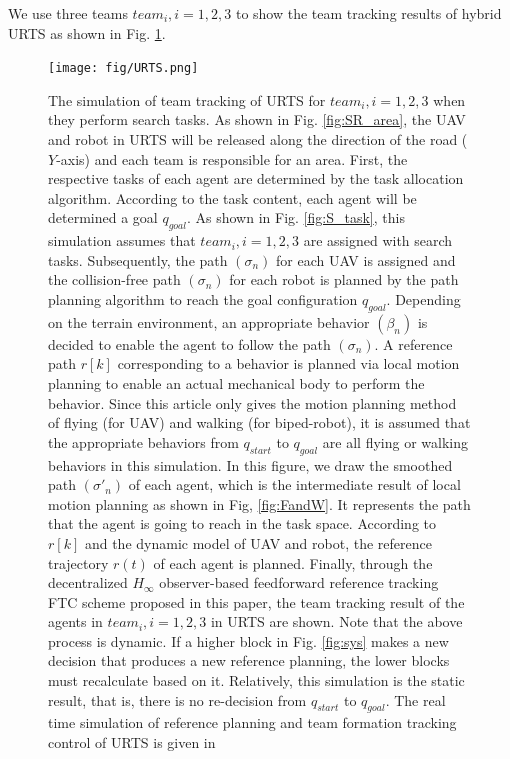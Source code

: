 \documentclass[journal,12pt,onecolumn,draftclsnofoot,]{IEEEtran}
\begin{document}
We use three teams $team_i, i=1, 2, 3$ to show the team tracking results of hybrid URTS as shown in Fig. \ref{fig:URTS}.
\begin{figure}[htbp]
    \centering
    \texttt{[image: fig/URTS.png]}\caption{The simulation of team tracking of URTS for $team_i,i=1,2,3$ when they perform search tasks. As shown in Fig. \ref{fig:SR_area}, the UAV and robot in URTS will be released along the direction of the road ($Y$-axis) and each team is responsible for an area. First, the respective tasks of each agent are determined by the task allocation algorithm. According to the task content, each agent will be determined a goal $q_{goal}$. As shown in Fig. \ref{fig:S_task}, this simulation assumes that $team_i,i=1,2,3$ are assigned with search tasks. Subsequently, the path $(\sigma_n)$ for each UAV is assigned and the collision-free path $(\sigma_n)$ for each robot is planned by the path planning algorithm to reach the goal configuration $q_{goal}$. Depending on the terrain environment, an appropriate behavior $(\beta_n)$ is decided to enable the agent to follow the path $(\sigma_n)$. A reference path $r[k]$ corresponding to a behavior is planned via local motion planning to enable an actual mechanical body to perform the behavior. Since this article only gives the motion planning method of flying (for UAV) and walking (for biped-robot), it is assumed that the appropriate behaviors from $q_{start}$ to $q_{goal}$ are all flying or walking behaviors in this simulation. In this figure, we draw the smoothed path $(\sigma'_n)$ of each agent, which is the intermediate result of local motion planning as shown in Fig, \ref{fig:FandW}. It represents the path that the agent is going to reach in the task space. According to $r[k]$ and the dynamic model of UAV and robot, the reference trajectory $r(t)$ of each agent is planned. Finally, through the decentralized $H_\infty$ observer-based feedforward reference tracking FTC scheme proposed in this paper, the team tracking result of the agents in $team_i, i=1,2,3$ in URTS are shown. Note that the above process is dynamic. If a higher block in Fig. \ref{fig:sys} makes a new decision that produces a new reference planning, the lower blocks must recalculate based on it. Relatively, this simulation is the static result, that is, there is no re-decision from $q_{start}$ to $q_{goal}$. The real time simulation of reference planning and team formation tracking control of URTS is given in \cite{mySimulation}}
    \label{fig:URTS}
\end{figure}
\end{document}
